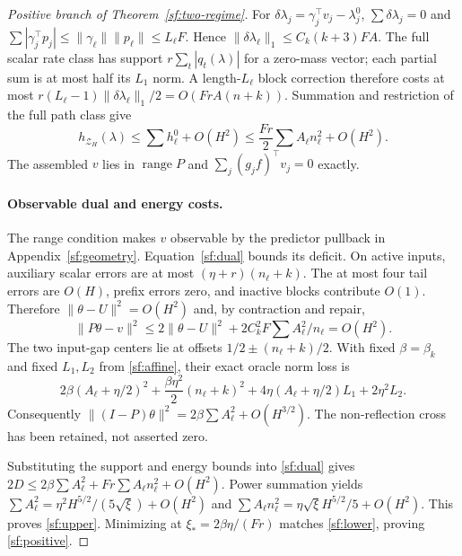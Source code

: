 \begin{proof}[Positive branch of Theorem~\ref{sf:two-regime}]
For $\delta\lambda_j=\gamma_j^\top v_j-\lambda_j^0$,
$\sum\delta\lambda_j=0$ and
$\sum|\gamma_j^\top p_j|\le\|\gamma_\ell\|\|p_\ell\|\le L_\ell F$.
Hence $\|\delta\lambda_\ell\|_1\le C_k(k+3)FA$.
The full scalar rate class has support $r\sum_t|q_t(\lambda)|$ for a zero-mass vector;
each partial sum is at most half its $L_1$ norm.
A length-$L_\ell$ block correction therefore costs
at most $r(L_\ell-1)\|\delta\lambda_\ell\|_1/2=O(FrA(n+k))$.
Summation and restriction of the full path class give
\begin{equation}\label{sf:positive-support}
h_{\mathcal Z_H}(\lambda)\le\sum h_\ell^0+O(H^2)
\le\frac{Fr}{2}\sum A_\ell n_\ell^2+O(H^2).
\end{equation}
The assembled $v$ lies in $\operatorname{range}P$ and
$\sum_j(g_jf)^\top v_j=0$ exactly.

\paragraph{Observable dual and energy costs.}
The range condition makes $v$ observable by the predictor pullback in
Appendix~\ref{sf:geometry}. Equation~\eqref{sf:dual} bounds its deficit.
On active inputs, auxiliary scalar errors are at most $(\eta+r)(n_\ell+k)$.
The at most four tail errors are $O(H)$, prefix errors zero, and inactive
blocks contribute $O(1)$.
Therefore $\|\theta-U\|^2=O(H^2)$ and, by contraction and repair,
\[
\|P\theta-v\|^2\le2\|\theta-U\|^2+2C_k^2F\sum A_\ell^2/n_\ell=O(H^2).
\]
The two input-gap centers lie at offsets $1/2\pm(n_\ell+k)/2$.
With fixed $\beta=\beta_k$ and fixed $L_1,L_2$ from \eqref{sf:affine},
their exact oracle norm loss is
\[
2\beta(A_\ell+\eta/2)^2+\frac{\beta\eta^2}{2}(n_\ell+k)^2
+4\eta(A_\ell+\eta/2)L_1+2\eta^2L_2 .
\]
Consequently $\|(I-P)\theta\|^2=2\beta\sum A_\ell^2+O(H^{3/2})$.
The non-reflection cross has been retained, not asserted zero.

Substituting the support and energy bounds into \eqref{sf:dual} gives
$2D\le2\beta\sum A_\ell^2+Fr\sum A_\ell n_\ell^2+O(H^2)$.
Power summation yields
$\sum A_\ell^2=\eta^2H^{5/2}/(5\sqrt\xi)+O(H^2)$ and
$\sum A_\ell n_\ell^2=\eta\sqrt\xi H^{5/2}/5+O(H^2)$.
This proves \eqref{sf:upper}. Minimizing at
$\xi_*=2\beta\eta/(Fr)$ matches \eqref{sf:lower}, proving \eqref{sf:positive}.
\end{proof}


